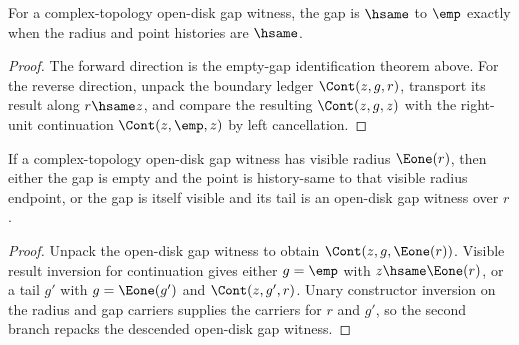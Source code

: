 \begin{lemma}
\label{lem:complex-topology-open-disk-gap-empty-gap-radius-point-iff}
For a complex-topology open-disk gap witness, the gap is \(\hsame\) to
\(\emp\) exactly when the radius and point histories are \(\hsame\).
\end{lemma}
\begin{proof}
The forward direction is the empty-gap identification theorem above. For the
reverse direction, unpack the boundary ledger \(\Cont(z,g,r)\), transport its
result along \(r\hsame z\), and compare the resulting \(\Cont(z,g,z)\) with the
right-unit continuation \(\Cont(z,\emp,z)\) by left cancellation.
\end{proof}

\begin{theorem}
\label{thm:cplx-topo-open-disk-gap-visible-radius-gap-cases}
If a complex-topology open-disk gap witness has visible radius \(\Eone(r)\),
then either the gap is empty and the point is history-same to that visible
radius endpoint, or the gap is itself visible and its tail is an open-disk gap
witness over \(r\).
\end{theorem}
\begin{proof}
Unpack the open-disk gap witness to obtain \(\Cont(z,g,\Eone(r))\). Visible
result inversion for continuation gives either \(g=\emp\) with
\(z\hsame\Eone(r)\), or a tail \(g'\) with \(g=\Eone(g')\) and
\(\Cont(z,g',r)\). Unary constructor inversion on the radius and gap carriers
supplies the carriers for \(r\) and \(g'\), so the second branch repacks the
descended open-disk gap witness.
\end{proof}

